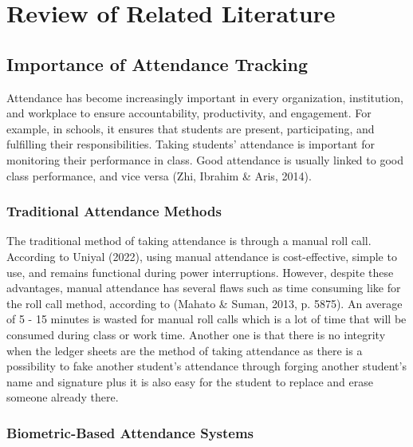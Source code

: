 \chapter{Review of Related Literature}
\label{sec:relatedlit}

\section{Importance of Attendance Tracking}

Attendance has become increasingly important in every organization, institution, and workplace to ensure accountability, productivity, and engagement. For example, in schools, it ensures that students are present, participating, and fulfilling their responsibilities. Taking students' attendance is important for monitoring their performance in class. Good attendance is usually linked to good class performance, and vice versa (Zhi, Ibrahim \& Aris, 2014).

\subsection{Traditional Attendance Methods}

The traditional method of taking attendance is through a manual roll call. According to Uniyal (2022), using manual attendance is cost-effective, simple to use, and remains functional during power interruptions. However, despite these advantages, manual attendance has several flaws such as time consuming like for the roll call method, according to (Mahato \& Suman, 2013, p. 5875). An average of 5 - 15 minutes is wasted for manual roll calls which is a lot of time that will be consumed during class or work time. Another one is that there is no integrity when the ledger sheets are the method of taking attendance as there is a possibility to fake another student’s attendance through forging another student’s name and signature plus it is also easy for the student to replace and erase someone already there.

\subsection{Biometric-Based Attendance Systems}

